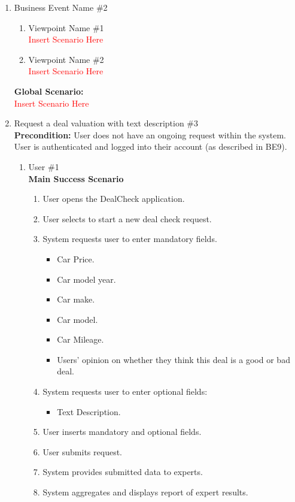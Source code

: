 \documentclass[]{article}
\begin{document}
\begin{enumerate}
\begin{enumerate}[{\bf {BE}1.}]
	\item Business Event Name \#2
	\begin{enumerate}[{\bf VP1.}]
		\item Viewpoint Name \#1 \\
		\textcolor{red}{Insert Scenario Here}
		\item Viewpoint Name \#2 \\
		\textcolor{red}{Insert Scenario Here}
	\end{enumerate}
	{\bf Global Scenario:}\\
	\textcolor{red}{Insert Scenario Here}

\item Request a deal valuation with text description \#3 \\
    {\bf Precondition:} User does not have an ongoing request within the system. User is authenticated and logged into their account (as described in BE9).
    \begin{enumerate}[{\bf VP1.}]
        \item User \#1 \\
        {\bf Main Success Scenario}
        \begin{enumerate}[1.]
            \item User opens the DealCheck application.
            \item User selects to start a new deal check request.
            \item System requests user to enter mandatory fields.
            \begin{itemize}
                \item Car Price.
                \item Car model year.
                \item Car make.
                \item Car model.
                \item Car Mileage.
                \item Users' opinion on whether they think this deal is a good or bad deal.
            \end{itemize}
            \item System requests user to enter optional fields:
            \begin{itemize}
                \item Text Description.
            \end{itemize}
            \item User inserts mandatory and optional fields.
            \item User submits request.
            \item System provides submitted data to experts.
            \item System aggregates and displays report of expert results.
        \end{enumerate}
        

\end{enumerate}
\end{enumerate}
\end{enumerate}
\end{document}
